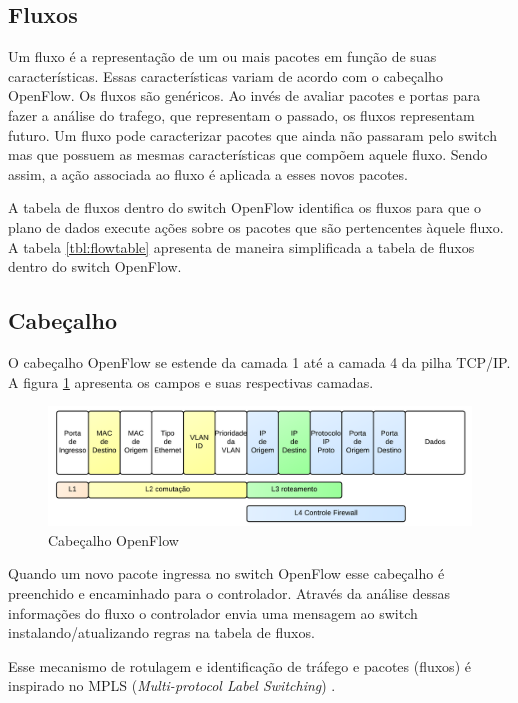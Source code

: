 \subsection{Fluxos}

Um fluxo é a representação de um ou mais pacotes em função de suas
características.
Essas características variam de acordo com o cabeçalho OpenFlow.
Os fluxos são genéricos. 
Ao invés de avaliar pacotes e portas para fazer a análise do trafego,
que representam o passado, os fluxos representam futuro. 
Um fluxo pode caracterizar pacotes que ainda não passaram pelo switch mas 
que possuem as mesmas características que compõem aquele fluxo. 
Sendo assim, a ação associada ao fluxo é aplicada a esses novos pacotes.




A tabela de fluxos dentro do switch OpenFlow identifica os fluxos para que o 
plano de dados execute ações sobre os pacotes que são pertencentes àquele
fluxo. 
A tabela \ref{tbl:flowtable} apresenta de maneira simplificada a tabela 
de fluxos dentro do switch OpenFlow.

\subsection{Cabeçalho}

O cabeçalho OpenFlow se estende da camada 1 até a camada 4 da pilha TCP/IP.
A figura \ref{fig:of-header} apresenta os campos e suas respectivas camadas.

\begin{figure}[h!]
    \centering
    \label{fig:of-header}
    \includegraphics[width=\linewidth]{img/openflow-header}
    \caption{Cabeçalho OpenFlow}
\end{figure}

Quando um novo pacote ingressa no switch OpenFlow esse cabeçalho é preenchido
e encaminhado para o controlador. 
Através da análise dessas informações do fluxo o controlador envia uma 
mensagem ao switch instalando/atualizando regras na tabela de fluxos. 

Esse mecanismo de rotulagem e identificação de tráfego e pacotes (fluxos) é
inspirado no MPLS (\emph{Multi-protocol Label Switching}) 
\citep{bruce2008mpls}.

